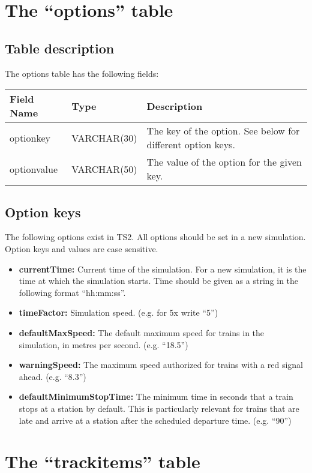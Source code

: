 \documentclass[12pt,a4paper]{article}
\begin{document}
\section{The ``options'' table}
\subsection{Table description}
The options table has the following fields:
\begin{center}
\begin{tabular}{|l|l|l|}
\hline
\textbf{Field Name}&\textbf{Type}&\textbf{Description}\\
\hline
optionkey&VARCHAR(30)&The key of the option. See below for different option keys.\\
\hline
optionvalue&VARCHAR(50)&The value of the option for the given key.\\
\hline
\end{tabular}
\end{center}

\subsection{Option keys}
The following options exist in TS2. All options should be set in a new simulation. Option keys and values are case sensitive.

\begin{itemize}
 \item \textbf{currentTime:} Current time of the simulation. For a new simulation, it is the time at which the simulation starts. Time should be given as a string in the following format ``hh:mm:ss''.
 \item \textbf{timeFactor:} Simulation speed. (e.g. for 5x write ``5'')
 \item \textbf{defaultMaxSpeed:} The default maximum speed for trains in the simulation, in metres per second. (e.g. ``18.5'')
 \item \textbf{warningSpeed:} The maximum speed authorized for trains with a red signal ahead. (e.g. ``8.3'')
 \item \textbf{defaultMinimumStopTime:} The minimum time in seconds that a train stops at a station by default. This is particularly relevant for trains that are late and arrive at a station after the scheduled departure time. (e.g. ``90'')
\end{itemize}

\section{The ``trackitems'' table}
\end{document}

